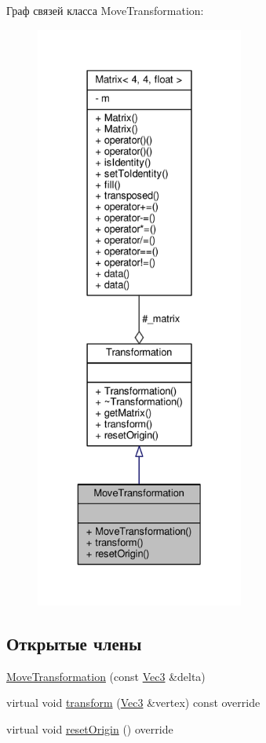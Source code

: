 Граф связей класса Move\+Transformation\+:
\nopagebreak
\begin{figure}[H]
\begin{center}
\leavevmode
\includegraphics[height=550pt]{d7/ddc/class_move_transformation__coll__graph}
\end{center}
\end{figure}
\subsection*{Открытые члены}
\begin{DoxyCompactItemize}
\item 
\hyperlink{class_move_transformation_ae2997ff6e97846840ff28ae0b60fe15d}{Move\+Transformation} (const \hyperlink{vec3_8h_a221ad8ea4d9be4111628ee1ca22ee3ba}{Vec3} \&delta)
\item 
virtual void \hyperlink{class_move_transformation_aecef1d1fab45fef381366c7dd54ced4d}{transform} (\hyperlink{vec3_8h_a221ad8ea4d9be4111628ee1ca22ee3ba}{Vec3} \&vertex) const override
\item 
virtual void \hyperlink{class_move_transformation_a7596e30e79d61ffaaf266ff39e540439}{reset\+Origin} () override
\end{DoxyCompactItemize}
